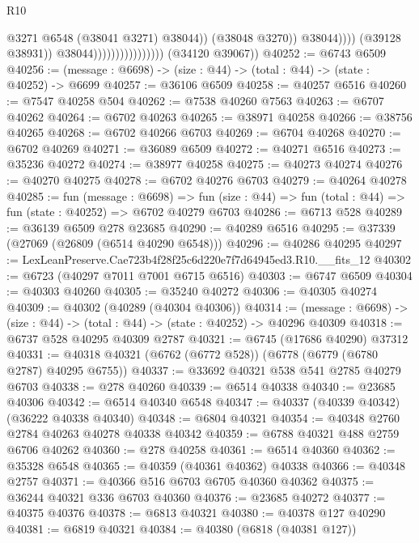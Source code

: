 \begin{lexlean}{R10}
\begin{coremodule}
                                                      @3271
                                                      @6548
                                                      (@38041 @3271)
                                                      @38044))
                                                  (@38048 @3270))
                                                @38044))))
                                        (@39128 @38931))
                                      @38044))))))))))))))))
      (@34120 @39067))
@40252 := @6743 @6509
@40256 := (message : @6698) -> (size : @44) -> (total : @44) -> (state : @40252) -> @6699
@40257 := @36106 @6509
@40258 := @40257 @6516
@40260 := @7547 @40258 @504
@40262 := @7538 @40260 @7563
@40263 := @6707 @40262
@40264 := @6702 @40263
@40265 := @38971 @40258
@40266 := @38756 @40265
@40268 := @6702 @40266 @6703
@40269 := @6704 @40268
@40270 := @6702 @40269
@40271 := @36089 @6509
@40272 := @40271 @6516
@40273 := @35236 @40272
@40274 := @38977 @40258
@40275 := @40273 @40274
@40276 := @40270 @40275
@40278 := @6702 @40276 @6703
@40279 := @40264 @40278
@40285 := fun (message : @6698) =>
  fun (size : @44) => fun (total : @44) => fun (state : @40252) => @6702 @40279 @6703
@40286 := @6713 @528
@40289 := @36139 @6509 @278 @23685
@40290 := @40289 @6516
@40295 := @37339 (@27069 (@26809 (@6514 @40290 @6548)))
@40296 := @40286 @40295
@40297 := LexLeanPreserve.Cae723b4f28f25c6d220e7f7d64945ed3.R10.__fits_12
@40302 := @6723 (@40297 @7011 @7001 @6715 @6516)
@40303 := @6747 @6509
@40304 := @40303 @40260
@40305 := @35240 @40272
@40306 := @40305 @40274
@40309 := @40302 (@40289 (@40304 @40306))
@40314 := (message : @6698) -> (size : @44) -> (total : @44) -> (state : @40252) -> @40296 @40309
@40318 := @6737 @528 @40295 @40309 @2787
@40321 := @6745 (@17686 @40290) @37312
@40331 := @40318 @40321 (@6762 (@6772 @528)) (@6778 (@6779 (@6780 @2787) @40295 @6755))
@40337 := @33692 @40321 @538 @541 @2785 @40279 @6703
@40338 := @278 @40260
@40339 := @6514 @40338
@40340 := @23685 @40306
@40342 := @6514 @40340 @6548
@40347 := @40337 (@40339 @40342) (@36222 @40338 @40340)
@40348 := @6804 @40321
@40354 := @40348 @2760 @2784 @40263 @40278 @40338 @40342
@40359 := @6788 @40321 @488 @2759 @6706 @40262
@40360 := @278 @40258
@40361 := @6514 @40360
@40362 := @35328 @6548
@40365 := @40359 (@40361 @40362) @40338
@40366 := @40348 @2757
@40371 := @40366 @516 @6703 @6705 @40360 @40362
@40375 := @36244 @40321 @336 @6703 @40360
@40376 := @23685 @40272
@40377 := @40375 @40376
@40378 := @6813 @40321
@40380 := @40378 @127 @40290
@40381 := @6819 @40321
@40384 := @40380 (@6818 (@40381 @127))

\end{coremodule}
\end{lexlean}
